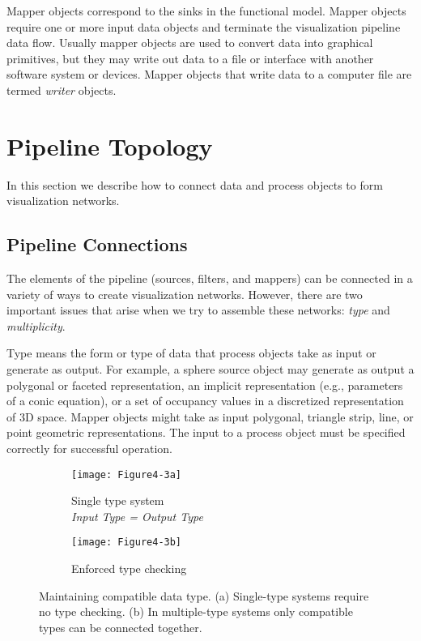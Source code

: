 Mapper objects correspond to the sinks in the functional model. Mapper objects require one or more input data objects and terminate the visualization pipeline data flow. Usually mapper objects are used to convert data into graphical primitives, but they may write out data to a file or interface with another software system or devices. Mapper objects that write data to a computer file are termed \emph{writer} objects.

\section{Pipeline Topology}
\label{sec:pipeline_topology}

In this section we describe how to connect data and process objects to form visualization networks.

\subsection{Pipeline Connections}
\label{subsec:pipeline_connections}

The elements of the pipeline (sources, filters, and mappers) can be connected in a variety of ways to create visualization networks. However, there are two important issues that arise when we try to assemble these networks: \emph{type} and \emph{multiplicity}.

Type means the form or type of data that process objects take as input or generate as output. For example, a sphere source object may generate as output a polygonal or faceted representation, an implicit representation (e.g., parameters of a conic equation), or a set of occupancy values in a discretized representation of 3D space. Mapper objects might take as input polygonal, triangle strip, line, or point geometric representations. The input to a process object must be specified correctly for successful operation.

\begin{figure}[htb]
    \centering
	\begin{subfigure}[h]{0.48\linewidth}
        \centering
		\texttt{[image: Figure4-3a]}
		\captionsetup{justification=centering}
		\caption{Single type system \\ \emph{Input Type = Output Type}} 
		\label{fig:Figure4-3a}
	\end{subfigure}
	\hfill
	\begin{subfigure}[h]{0.48\linewidth}
		\texttt{[image: Figure4-3b]}
		\captionsetup{justification=centering}
		\caption{Enforced type checking}
		\label{fig:Figure4-3b}
	\end{subfigure}
	\caption{Maintaining compatible data type. (a) Single-type systems require no type checking. (b) In multiple-type systems only compatible types can be connected together.}\label{fig:Figure4-3}
\end{figure}

